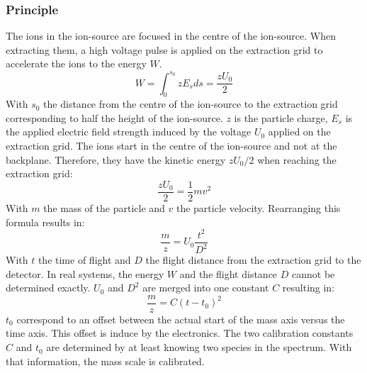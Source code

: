	\subsubsection{Principle} %
	The ions in the ion-source are focused in the centre of the ion-source. When extracting them, a high voltage pulse is applied on the extraction grid to accelerate the ions to the energy $W$.
	\begin{equation}
		W = \int_{0}^{s_0}z E_s ds =  \frac{z U_0}{2}
		\label{eq:WIonPulse}
	\end{equation}
	With $s_0$ the distance from the centre of the ion-source to the extraction grid corresponding to half the height of the ion-source. $z$ is the particle charge, $E_s$ is the applied electric field strength induced by the voltage $U_0$ applied on the extraction grid. The ions start in the centre of the ion-source and not at the backplane. Therefore, they have the kinetic energy $z U_0/2$ when reaching the extraction grid:
	\begin{equation}
		\frac{z U_0}{2} = \frac{1}{2}m v^2
	\end{equation}
	With $m$ the mass of the particle and $v$ the particle velocity. Rearranging this formula results in:
	\begin{equation}
		\frac{m}{z} = U_0\frac{t^2}{D^2}
		\label{eq:m/q}
	\end{equation}
	With $t$ the time of flight and $D$ the flight distance from the extraction grid to the detector. In real systems, the energy $W$ and the flight distance $D$ cannot be determined exactly. $U_0$ and $D^2$ are merged into one constant $C$ resulting in:
	\begin{equation}
		\frac{m}{z} = C(t-t_0)^2
		\label{eq:mass_Calib}
	\end{equation}
	$t_0$ correspond to an offset between the actual start of the mass axis versus the time axis. This offset is induce by the electronics. The two calibration constants $C$ and $t_0$ are determined by at least knowing two species in the spectrum. With that information, the mass scale is calibrated.
	
